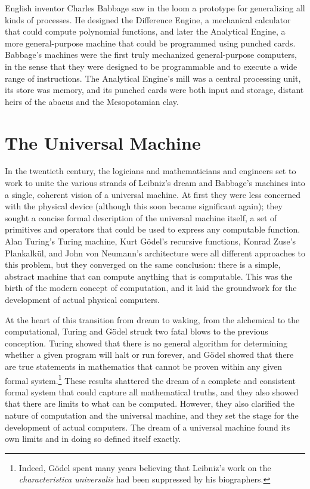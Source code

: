 English inventor Charles Babbage saw in the loom a prototype for generalizing all kinds of processes.  He designed the Difference Engine, a mechanical calculator that could compute polynomial functions, and later the Analytical Engine, a more general-purpose machine that could be programmed using punched cards.  Babbage's machines were the first truly mechanized general-purpose computers, in the sense that they were designed to be programmable and to execute a wide range of instructions.  The Analytical Engine's mill was a central processing unit, its store was memory, and its punched cards were both input and storage, distant heirs of the abacus and the Mesopotamian clay.

\section{The Universal Machine}

In the twentieth century, the logicians and mathematicians and engineers set to work to unite the various strands of Leibniz's dream and Babbage's machines into a single, coherent vision of a universal machine.  At first they were less concerned with the physical device (although this soon became significant again); they sought a concise formal description of the universal machine itself, a set of primitives and operators that could be used to express any computable function.  Alan Turing's Turing machine, Kurt G\"{o}del's recursive functions, Konrad Zuse's Plankalk\"{u}l, and John von Neumann's architecture were all different approaches to this problem, but they converged on the same conclusion:  there is a simple, abstract machine that can compute anything that is computable.  This was the birth of the modern concept of computation, and it laid the groundwork for the development of actual physical computers.

At the heart of this transition from dream to waking, from the alchemical to the computational, Turing and G\"{o}del struck two fatal blows to the previous conception.  Turing showed that there is no general algorithm for determining whether a given program will halt or run forever, and G\"{o}del showed that there are true statements in mathematics that cannot be proven within any given formal system.\footnote{Indeed, G\"{o}del spent many years believing that Leibniz's work on the \emph{characteristica universalis} had been suppressed by his biographers.}  These results shattered the dream of a complete and consistent formal system that could capture all mathematical truths, and they also showed that there are limits to what can be computed.  However, they also clarified the nature of computation and the universal machine, and they set the stage for the development of actual computers.  The dream of a universal machine found its own limits and in doing so defined itself exactly.

